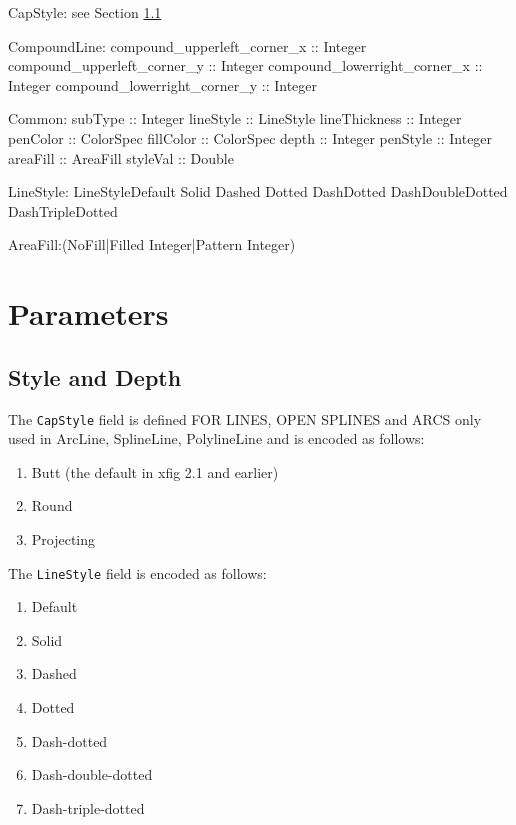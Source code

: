 \documentclass[10pt, a4paper]{article}
\begin{document}
CapStyle: see Section \ref{subsec:styDep}


CompoundLine:
compound\_upperleft\_corner\_x :: Integer
compound\_upperleft\_corner\_y :: Integer
compound\_lowerright\_corner\_x :: Integer
compound\_lowerright\_corner\_y :: Integer






Common:
subType :: Integer
lineStyle :: LineStyle
lineThickness :: Integer
penColor :: ColorSpec
fillColor :: ColorSpec
depth :: Integer
penStyle :: Integer
areaFill :: AreaFill
styleVal :: Double

LineStyle:
LineStyleDefault	 
Solid	 
Dashed	 
Dotted	 
DashDotted	 
DashDoubleDotted	 
DashTripleDotted	 



AreaFill:(NoFill|Filled Integer|Pattern Integer)





\section{Parameters}\label{sec:param}

\subsection{Style and Depth}\label{subsec:styDep}

The {\tt CapStyle} field is defined FOR LINES, OPEN SPLINES and ARCS only 
used in ArcLine, SplineLine, PolylineLine
and is encoded as follows:
%
\begin{enumerate}
\item[0] Butt (the default in xfig 2.1 and earlier)
\item    Round
\item    Projecting
\end{enumerate}

\noindent
The {\tt LineStyle} field is encoded as follows:
%
\begin{enumerate}
\item[-1] Default
\item[0]  Solid
\item     Dashed
\item     Dotted
\item     Dash-dotted
\item     Dash-double-dotted
\item     Dash-triple-dotted
\end{enumerate}
\end{document}
